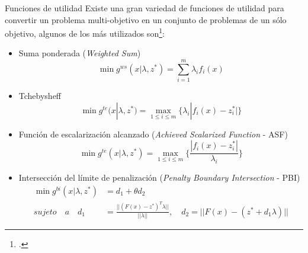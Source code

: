 \documentclass{beamer}
\begin{document}
\begin{frame}{Funciones de utilidad}
\justifying
\scriptsize
Existe una gran variedad de funciones de utilidad para convertir un problema multi-objetivo en un conjunto de problemas de un sólo objetivo, algunos de los más utilizados son\footcite{raquel_2018}:
\begin{itemize}
\scriptsize
\item Suma ponderada (\textit{Weighted Sum})
\begin{equation*}
\min_{} g^{ws}(x | \lambda, z^*) = \sum_{i=1}^m \lambda_i f_i(x)     
\end{equation*}
\item Tchebysheff 
\begin{equation*}
    \min_{} g^{te}(x | \lambda, z^*) = \max_{1 \leq i \leq m } \{ \lambda_i | f_i(x) - z_i^* | \}
\end{equation*}{}
\item Función de escalarización alcanzado (\textit{Achieved Scalarized Function} - ASF)
\begin{equation*}
    \min_{} g^{te}(x | \lambda, z^*) = \max_{1 \leq i \leq m } \{ \frac{| f_i(x) - z_i^* |}{\lambda_i}\}
\end{equation*}{}
\item Intersección del límite de penalización (\textit{Penalty Boundary Intersection} - PBI)
\begin{equation*}
\begin{split}
    \min g^{bi}(x | \lambda, z^*) &= d_1 + \theta d_2    \\
    sujeto \quad  a \quad d_1 &= \frac{|| (F(x) - z^*)^T \lambda  || }{|| \lambda ||}, \quad d_2 = || F(x) - (z^* + d_1 \lambda )||
\end{split}
\end{equation*}
\end{itemize}
\end{frame}
\end{document}
